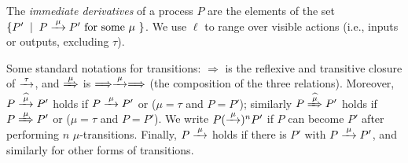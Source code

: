 The \emph{immediate derivatives} of a
process $P$ are the elements of  the set $\{P' \st P \arr\mu P' \mbox{ for some $\mu$ }
\}$.   
We use $\ell$ to range over
 visible actions (i.e.,  inputs or outputs, excluding  $\tau$).
\begin{figure*}
\begin{center}
 $\displaystyle{   P \arr\mu   P' \over   P + Q   \arr\mu
P'  } $  $ \hb$   
 $\displaystyle{   P \arr\mu   P' \over   P | Q   \arr\mu
P' | Q } $  $ \hb$   
  $\; \;$  $\displaystyle{ P \arr{ a}P' \hk \hk  Q
\arr{\outC a }Q'  \over     P|  Q \arr{ \tau} P'
|  Q'  }$ 
\\
\hskip .6cm  
 $\displaystyle{  \over  \mu.  P    \arr\mu
P } $  $ \hb$   
\hskip .6cm  
$\displaystyle{ P \arr{\mu}P' \over
 \res a     P   \arr{\mu} \res a P'} $ $ \mu \neq a, \outC a$
$ \hb$ %
\hskip .5cm 
$\displaystyle{ P \arr{\mu}P' \over
 K   \arr{ \mu} P'  } $  if  $  K \Defi P$
\end{center}
\caption{The LTS for CCS}
\label{f:LTSCCS}
\end{figure*}


Some standard notations for transitions:  $\Longrightarrow $ is the 
reflexive and  transitive closure of $\arr\tau $, and 
$\Arr \mu $ is $\Longrightarrow \arr\mu \Longrightarrow $ (the
composition of the three relations).
Moreover,   
$ 
P \arcap \mu P'$ holds if $P \arr\mu P'$ or ($\mu =\tau$ and
$P=P'$); similarly 
$ 
P \Arcap \mu P'$ holds if $P \Arr\mu P'$ or ($\mu =\tau$ and
$P=P'$).
We write $P (\arr\mu)^n P'$ if $P$ can become $P'$ after performing
$n$ $\mu$-transitions. Finally, $P \arr\mu$ holds if there is $P'$
with $P \arr\mu P'$, and similarly for other forms of transitions.





